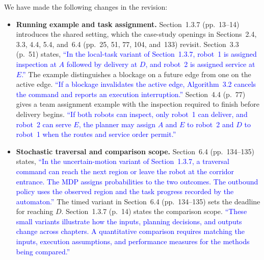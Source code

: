 \documentclass[11pt]{article}
\newcommand{\change}[1]{\textcolor{blue}{#1}}
\begin{document}
We have made the following changes in the revision:
\begin{itemize}
\item \textbf{Running example and task assignment.} Section~1.3.7 (pp.~13--14)
introduces the shared setting, which the case-study openings in Sections~2.4, 3.3,
4.4, 5.4, and~6.4 (pp.~25, 51, 77, 104, and~133) revisit. Section~3.3 (p.~51) states,
\change{``In the local-task variant of Section~1.3.7, robot~1 is assigned inspection
at $A$ followed by delivery at $D$, and robot~2 is assigned service at $E$.''}
The example distinguishes a blockage on a future edge from one on the active edge.
\change{``If a blockage invalidates the active edge, Algorithm~3.2 cancels the
command and reports an execution interruption.''}
Section~4.4 (p.~77) gives a team assignment example with the inspection required
to finish before delivery begins.
\change{``If both robots can inspect, only robot~1 can deliver, and robot~2 can
serve $E$, the planner may assign $A$ and $E$ to robot~2 and $D$ to
robot~1 when the routes and service order permit.''}

\item \textbf{Stochastic traversal and comparison scope.} Section~6.4 (pp.~134--135)
states,
\change{``In the uncertain-motion variant of Section~1.3.7, a traversal command can
reach the next region or leave the robot at the corridor entrance. The MDP assigns
probabilities to the two outcomes. The outbound policy uses the observed region and
the task progress recorded by the automaton.''}
The timed variant in Section~6.4 (pp.~134--135) sets the deadline for reaching $D$.
Section~1.3.7 (p.~14) states the comparison scope.
\change{``These small variants illustrate how the inputs, planning decisions, and
outputs change across chapters. A quantitative comparison requires matching
the inputs, execution assumptions, and performance measures for the
methods being compared.''}
\end{itemize}
\end{document}
